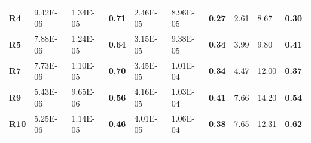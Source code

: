 \documentclass[encoding=utf8,british]{tumphthesis}
\begin{document}
\begin{table}[H]
\begin{subtable}{1\textwidth}
{\begin{tabular}{|l|llr|llr|llr|}
\textbf{R4}                               & 9.42E-06                                             & 1.34E-05                                              & \textbf{0.71}                                    & 2.46E-05                                             & 8.96E-05                                              & \textbf{0.27}                                    & 2.61                                                 & 8.67                                                  & \textbf{0.30}                                    \\
\rowcolor[HTML]{CFE2F3} 
\textbf{R5}                               & 7.88E-06                                             & 1.24E-05                                              & \textbf{0.64}                                    & 3.15E-05                                            & 9.38E-05                                              & \textbf{0.34}                                    & 3.99                                                 & 9.80                                                  & \textbf{0.41}                                    \\
\textbf{R7}                               & 7.73E-06                                             & 1.10E-05                                              & \textbf{0.70}                                    & 3.45E-05                                             & 1.01E-04                                              & \textbf{0.34}                                    & 4.47                                                 & 12.00                                                 & \textbf{0.37}                                    \\
\rowcolor[HTML]{CFE2F3} 
\textbf{R9}                               & 5.43E-06                                             & 9.65E-06                                              & \textbf{0.56}                                    & 4.16E-05                                             & 1.03E-04                                              & \textbf{0.41}                                    & 7.66                                                 & 14.20                                                 & \textbf{0.54}                                    \\
\textbf{R10}                              & 5.25E-06                                             & 1.14E-05                                              & \textbf{0.46}                                    & 4.01E-05                                             & 1.06E-04                                              & \textbf{0.38}                                    & 7.65                                                 & 12.31                                                 & \textbf{0.62}                                    \\

\end{tabular}}
\end{subtable}
\end{table}
\end{document}
